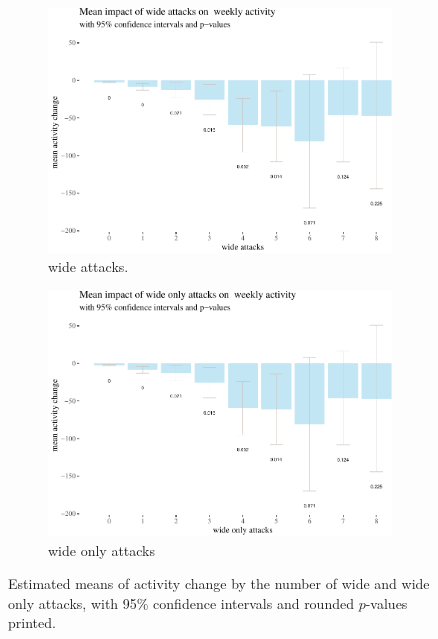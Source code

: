 \documentclass[10pt,]{scrartcl}
\begin{document}
\begin{figure}[h!]

\centering
\begin{subfigure}[t]{0.75\textwidth}

\begin{center}\includegraphics[width=1\linewidth]{redditAnalysisWalkthrough_files/figure-latex/unnamed-chunk-30-1} \end{center}
\caption{wide attacks.}
\end{subfigure}
 
\begin{subfigure}[t]{0.75\textwidth}

\begin{center}\includegraphics[width=1\linewidth]{redditAnalysisWalkthrough_files/figure-latex/unnamed-chunk-31-1} \end{center}
\caption{wide only attacks}
\end{subfigure}

\caption{Estimated means of activity change by the number of wide and wide only attacks, with 95\% confidence intervals and rounded $p$-values printed.}
\label{fig:lowerTableBars}
\end{figure}
\end{document}
